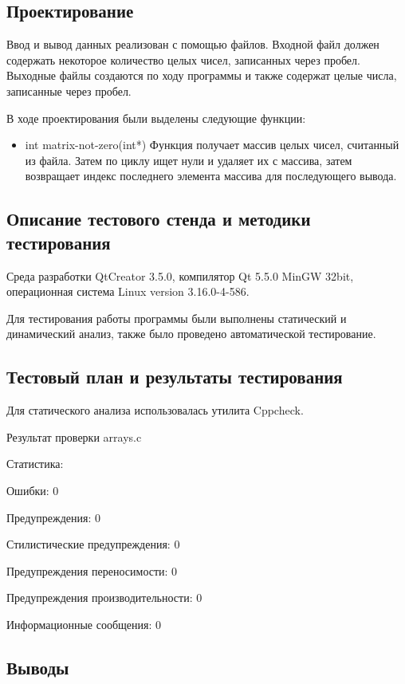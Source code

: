 \documentclass[12pt,a4paper]{report}
\begin{document}
\subsection{Проектирование}

Ввод и вывод данных реализован с помощью файлов. Входной файл должен содержать некоторое количество целых чисел, записанных через пробел. Выходные файлы создаются по ходу программы и также содержат целые числа, записанные через пробел.
 
В ходе проектирования были выделены следующие функции:

\begin{itemize}
 	
 	\item int matrix-not-zero(int*)
 	Функция получает массив целых чисел, считанный из файла. Затем по циклу ищет нули и удаляет их с массива, затем возвращает индекс последнего элемента массива для последующего вывода.
 	
\end{itemize}
	
\subsection{Описание тестового стенда и методики тестирования}
Среда разработки QtCreator 3.5.0, компилятор Qt 5.5.0 MinGW 32bit, операционная система Linux version 3.16.0-4-586.

Для тестирования работы программы были выполнены статический и динамический анализ, также было проведено автоматической тестирование.
\subsection{Тестовый план и результаты тестирования}

Для статического анализа использовалась утилита Cppcheck.

\vspace{\baselineskip}
Результат проверки arrays.c 

Статистика:

Ошибки:	0

Предупреждения:	0

Стилистические предупреждения:	0

Предупреждения переносимости:	0

Предупреждения производительности:	0

Информационные сообщения:	0

\subsection{Выводы}
\end{document}
